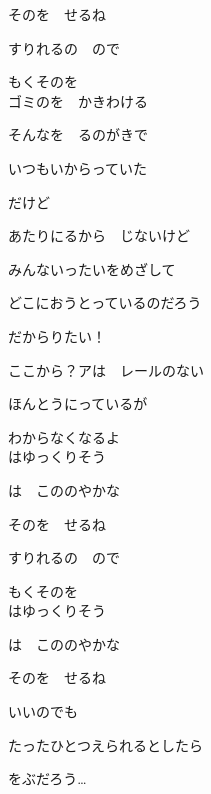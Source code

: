 {そのを　せるね

すりれるの　ので

もくそのを
\\

ゴミのを　かきわける

そんなを　るのがきで

いつもいからっていた

だけど

あたりにるから　じないけど

みんないったいをめざして

どこにおうとっているのだろう

だからりたい！

ここから？アは　レールのない

ほんとうにっているが

わからなくなるよ
\\

はゆっくりそう

は　こののやかな

そのを　せるね

すりれるの　ので

もくそのを
\\

はゆっくりそう

は　こののやかな

そのを　せるね

いいのでも

たったひとつえられるとしたら

をぶだろう…

}